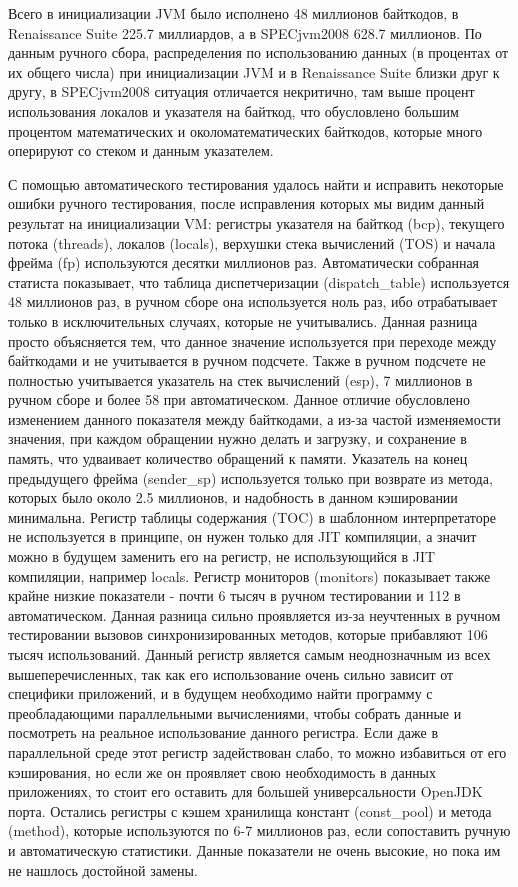 Всего в инициализации JVM было исполнено 48 миллионов байткодов, в Renaissance Suite 225.7 миллиардов, а в SPECjvm2008 628.7 миллионов. По данным ручного сбора, распределения по использованию данных (в процентах от их общего числа) при инициализации JVM и в Renaissance Suite близки друг к другу, в SPECjvm2008 ситуация отличается некритично, там выше процент использования локалов и указателя на байткод, что обусловлено большим процентом математических и околоматематических байткодов, которые много оперируют со стеком и данным указателем.

С помощью автоматического тестирования удалось найти и исправить некоторые ошибки ручного тестирования, после исправления которых мы видим данный результат на инициализации VM: регистры указателя на байткод (bcp), текущего потока (threads), локалов (locals), верхушки стека вычислений (TOS) и начала фрейма (fp) используются десятки миллионов раз. Автоматически собранная статиста показывает, что таблица диспетчеризации (dispatch\_table) используется 48 миллионов раз, в ручном сборе она используется ноль раз, ибо отрабатывает только в исключительных случаях, которые не учитывались. Данная разница просто объясняется тем, что данное значение используется при переходе между байткодами и не учитывается в ручном подсчете. Также в ручном подсчете не полностью учитывается указатель на стек вычислений (esp), 7 миллионов в ручном сборе и более 58 при автоматическом. Данное отличие обусловлено изменением данного показателя между байткодами, а из-за частой изменяемости значения, при каждом обращении нужно делать и загрузку, и сохранение в память, что удваивает количество обращений к памяти. Указатель на конец предыдущего фрейма (sender\_sp) используется только при возврате из метода, которых было около 2.5 миллионов, и надобность в данном кэшировании минимальна. Регистр таблицы содержания (TOC) в шаблонном интерпретаторе не используется в принципе, он нужен только для JIT компиляции, а значит можно в будущем заменить его на регистр, не использующийся в JIT компиляции, например locals. Регистр мониторов (monitors) показывает также крайне низкие показатели - почти 6 тысяч в ручном тестировании и 112 в автоматическом. Данная разница сильно проявляется из-за неучтенных в ручном тестировании вызовов синхронизированных методов, которые прибавляют 106 тысяч использований. Данный регистр является самым неоднозначным из всех вышеперечисленных, так как его использование очень сильно зависит от специфики приложений, и в будущем необходимо найти программу с преобладающими параллельными вычислениями, чтобы собрать данные и посмотреть на реальное использование данного регистра. Если даже в параллельной среде этот регистр задействован слабо, то можно избавиться от его кэширования, но если же он проявляет свою необходимость в данных приложениях, то стоит его оставить для большей универсальности OpenJDK порта. Остались регистры с кэшем хранилища констант (const\_pool) и метода (method), которые используются по 6-7 миллионов раз, если сопоставить ручную и автоматическую статистики. Данные показатели не очень высокие, но пока им не нашлось достойной замены.


